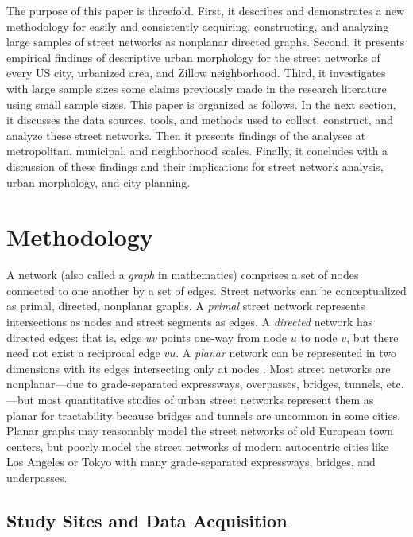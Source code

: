 \documentclass[Afour,sageh,times]{sagej}
\renewcommand{\cite}{\citep}
\begin{document}
The purpose of this paper is threefold. First, it describes and demonstrates a new methodology for easily and consistently acquiring, constructing, and analyzing large samples of street networks as nonplanar directed graphs. Second, it presents empirical findings of descriptive urban morphology for the street networks of every US city, urbanized area, and Zillow neighborhood. Third, it investigates with large sample sizes some claims previously made in the research literature using small sample sizes. This paper is organized as follows. In the next section, it discusses the data sources, tools, and methods used to collect, construct, and analyze these street networks. Then it presents findings of the analyses at metropolitan, municipal, and neighborhood scales. Finally, it concludes with a discussion of these findings and their implications for street network analysis, urban morphology, and city planning.



\section{Methodology}

A network (also called a \emph{graph} in mathematics) comprises a set of nodes connected to one another by a set of edges. Street networks can be conceptualized as primal, directed, nonplanar graphs. A \emph{primal} street network represents intersections as nodes and street segments as edges. A \emph{directed} network has directed edges: that is, edge $uv$ points one-way from node $u$ to node $v$, but there need not exist a reciprocal edge $vu$. A \emph{planar} network can be represented in two dimensions with its edges intersecting only at nodes \cite{viana_simplicity_2013, fischer_spatial_2014}. Most street networks are nonplanar---due to grade-separated expressways, overpasses, bridges, tunnels, etc.---but most quantitative studies of urban street networks represent them as planar \cite[e.g.,][]{buhl_topological_2006, cardillo_structural_2006, barthelemy_modeling_2008, masucci_random_2009, strano_urban_2013} for tractability because bridges and tunnels are uncommon in some cities. Planar graphs may reasonably model the street networks of old European town centers, but poorly model the street networks of modern autocentric cities like Los Angeles or Tokyo with many grade-separated expressways, bridges, and underpasses.

\subsection{Study Sites and Data Acquisition}
\end{document}

